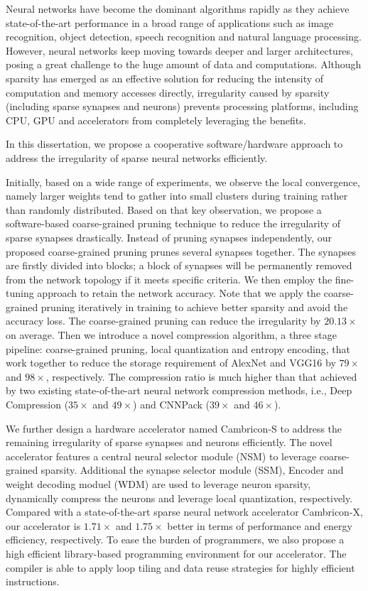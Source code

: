 \begin{enabstract}
Neural networks have become the dominant algorithms rapidly as they achieve state-of-the-art performance in a broad range of applications such as image recognition, object detection, speech recognition and natural language processing. However, neural networks keep moving towards deeper and larger architectures, posing a great challenge to the huge amount of data and computations. Although sparsity has emerged as an effective solution for reducing the intensity of computation and memory accesses directly, irregularity caused by sparsity (including sparse synapses and neurons) prevents processing platforms, including CPU, GPU and accelerators from completely leveraging the benefits. 

In this dissertation, we propose a cooperative software/hardware approach to address the irregularity of sparse neural networks efficiently. 

Initially, based on a wide range of experiments, we observe the local convergence, namely larger weights tend to gather into small clusters during training rather than randomly distributed. Based on that key observation, we propose a software-based coarse-grained pruning technique to reduce the irregularity of sparse synapses drastically. Instead of pruning synapses independently, our proposed coarse-grained pruning prunes several synapses together. The synapses are firstly divided into blocks; a block of synapses will be permanently removed from the network topology if it meets specific criteria. We then employ the fine-tuning approach to retain the network accuracy. Note that we apply the coarse-grained pruning iteratively in training to achieve better sparsity and avoid the accuracy loss. The coarse-grained pruning can reduce the irregularity by $20.13\times$ on average. Then we introduce a novel compression algorithm, a three stage pipeline: coarse-grained pruning, local quantization and entropy encoding, that work together to reduce the storage requirement of AlexNet and VGG16 by $79\times$ and $98\times$, respectively. The compression ratio is much higher than that achieved by two existing state-of-the-art neural network compression methods, i.e., Deep Compression ($35\times$ and $49\times$) and CNNPack ($39\times$ and $46\times$).

We further design a hardware accelerator named Cambricon-S to address the remaining irregularity of sparse synapses and neurons efficiently. The novel accelerator features a central neural selector module (NSM) to leverage coarse-grained sparsity. Additional the synapse selector module (SSM), Encoder and weight decoding moduel (WDM) are used to leverage neuron sparsity, dynamically compress the neurons and leverage local quantization, respectively. Compared with a state-of-the-art sparse neural network accelerator Cambricon-X, our accelerator is $1.71\times$ and $1.75\times$ better in terms of performance and energy efficiency, respectively. To ease the burden of programmers, we also propose a high efficient library-based programming environment for our accelerator. The compiler is able to apply loop tiling and data reuse strategies for highly efficient instructions. 

\end{enabstract}
